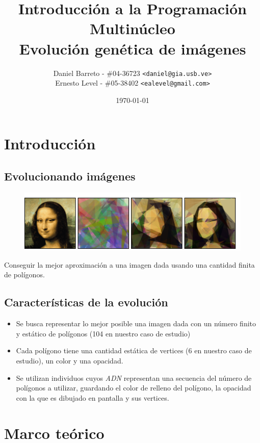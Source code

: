 \documentclass[11pt, spanish]{article}
\begin{document}
\title{Introducción a la Programación Multinúcleo\\Evolución genética de imágenes}
\author{Daniel Barreto - \#04-36723 \texttt{<daniel@gia.usb.ve>} \\ Ernesto Level - \#05-38402 \texttt{<ealevel@gmail.com>}}
\date{\today}

\maketitle

\section{Introducción}
\subsection{Evolucionando imágenes}
\begin{figure}[htp]
	\centering
	\includegraphics[scale=0.7]{media/evolution.png}
\end{figure}

Conseguir la mejor aproximación a una imagen dada usando una cantidad finita de polígonos.

\subsection{Características de la evolución}
\begin{itemize}
	\item Se busca representar lo mejor posible una imagen dada con un número finito y estático de polígonos (104 en nuestro caso de estudio)
	\item Cada polígono tiene una cantidad estática de vertices (6 en nuestro caso de estudio), un color y una opacidad.
	\item Se utilizan individuos cuyos \emph{ADN} representan una secuencia del número de polígonos a utilizar, guardando el color de relleno del polígono, la opacidad con la que es dibujado en pantalla y sus vertices.
\end{itemize}

\section{Marco teórico}
\end{document}
